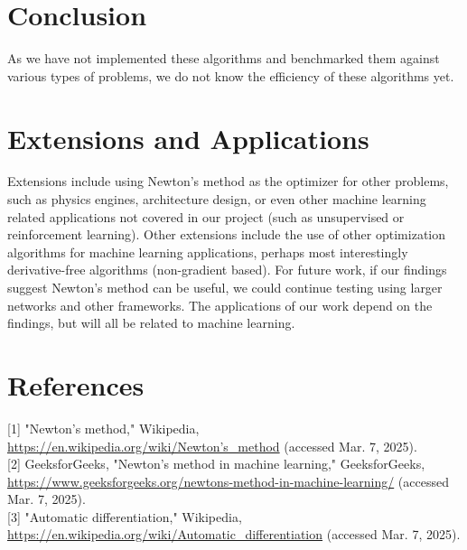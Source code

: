\documentclass{article}
\begin{document}
\section*{Conclusion}
As we have not implemented these algorithms and benchmarked them against various types of problems, we do not know the efficiency of these algorithms yet.

\section*{Extensions and Applications}
Extensions include using Newton's method as the optimizer for other problems, such as physics engines, architecture design, or even other machine learning related applications not covered in our project (such as unsupervised or reinforcement learning). Other extensions include the use of other optimization algorithms for machine learning applications, perhaps most interestingly derivative-free algorithms (non-gradient based). For future work, if our findings suggest Newton's method can be useful, we could continue testing using larger networks and other frameworks. The applications of our work depend on the findings, but will all be related to machine learning.

\section*{References}
[1] "Newton's method," Wikipedia, \href{https://en.wikipedia.org/wiki/Newton%27s_method}{https://en.wikipedia.org/wiki/Newton's\_method} (accessed Mar. 7, 2025).\\[0pt]
[2] GeeksforGeeks, "Newton's method in machine learning," GeeksforGeeks, \href{https://www.geeksforgeeks.org/newtons-method-in-machine-learning/}{https://www.geeksforgeeks.org/newtons-method-in-machine-learning/} (accessed Mar. 7, 2025).\\[0pt]
[3] "Automatic differentiation," Wikipedia, \href{https://en.wikipedia.org/wiki/Automatic_differentiation}{https://en.wikipedia.org/wiki/Automatic\_differentiation} (accessed Mar. 7, 2025).
\end{document}
